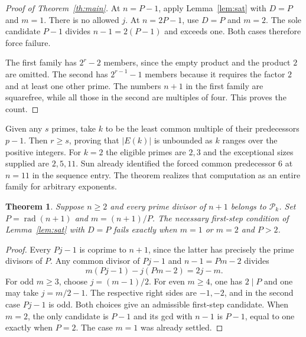 \documentclass[11pt]{article}
\newtheorem{theorem}{Theorem}
\newcommand{\rad}{\operatorname{rad}}
\begin{document}
\begin{proof}[Proof of Theorem~\ref{th:main}]
At $n=P-1$, apply Lemma~\ref{lem:sat} with $D=P$ and $m=1$. There is no allowed $j$. At $n=2P-1$, use $D=P$ and $m=2$. The sole candidate $P-1$ divides $n-1=2(P-1)$ and exceeds one. Both cases therefore force failure.

The first family has $2^r-2$ members, since the empty product and the product $2$ are omitted. The second has $2^{r-1}-1$ members because it requires the factor $2$ and at least one other prime. The numbers $n+1$ in the first family are squarefree, while all those in the second are multiples of four. This proves the count.
\end{proof}

Given any $s$ primes, take $k$ to be the least common multiple of their predecessors $p-1$. Then $r\ge s$, proving that $|E(k)|$ is unbounded as $k$ ranges over the positive integers. For $k=2$ the eligible primes are $2,3$ and the exceptional sizes supplied are $2,5,11$. Sun already identified the forced common predecessor $6$ at $n=11$ in the sequence entry. The theorem realizes that computation as an entire family for arbitrary exponents.

\begin{theorem}\label{th:sharp}
Suppose $n\ge2$ and every prime divisor of $n+1$ belongs to $\mathcal P_k$. Set $P=\rad(n+1)$ and $m=(n+1)/P$. The necessary first-step condition of Lemma~\ref{lem:sat} with $D=P$ fails exactly when $m=1$ or $m=2$ and $P>2$.
\end{theorem}
\begin{proof}
Every $Pj-1$ is coprime to $n+1$, since the latter has precisely the prime divisors of $P$. Any common divisor of $Pj-1$ and $n-1=Pm-2$ divides
\[
       m(Pj-1)-j(Pm-2)=2j-m .
\]
For odd $m\ge3$, choose $j=(m-1)/2$. For even $m\ge4$, one has $2\mid P$ and one may take $j=m/2-1$. The respective right sides are $-1,-2$, and in the second case $Pj-1$ is odd. Both choices give an admissible first-step candidate. When $m=2$, the only candidate is $P-1$ and its gcd with $n-1$ is $P-1$, equal to one exactly when $P=2$. The case $m=1$ was already settled.
\end{proof}
\end{document}
